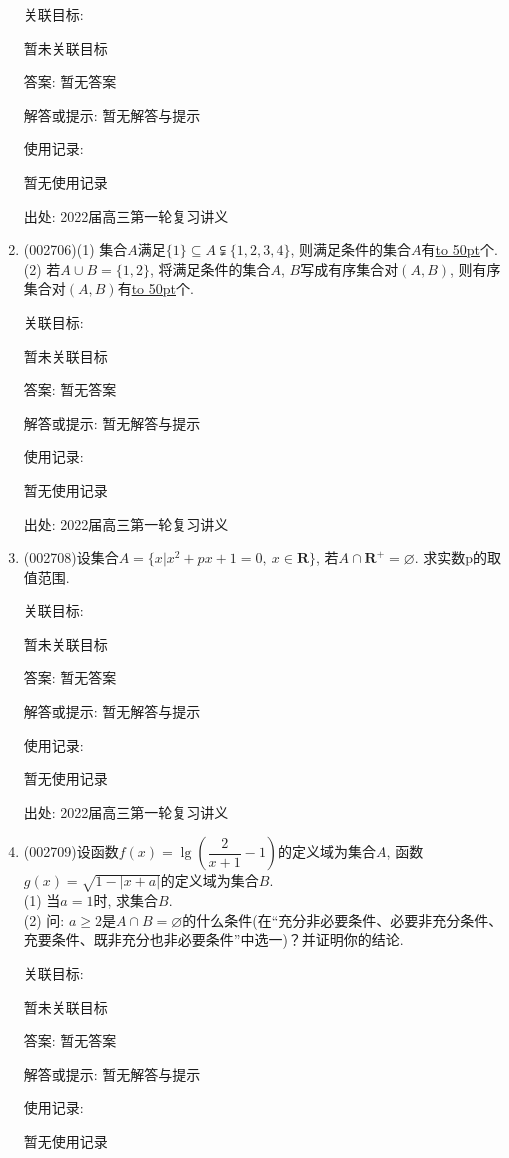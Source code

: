 \documentclass[10pt,a4paper]{article}
\newcommand{\blank}[1]{\underline{\hbox to #1pt{}}}
\begin{document}
\begin{enumerate}[1.]
关联目标:

暂未关联目标

答案: 暂无答案

解答或提示: 暂无解答与提示

使用记录:

暂无使用记录


出处: 2022届高三第一轮复习讲义
\item { (002706)}(1) 集合$A$满足$\{1\}\subseteq A \subsetneqq \{1,2,3,4\}$, 则满足条件的集合$A$有\blank{50}个.
(2) 若$A\cup B=\{1,2\}$, 将满足条件的集合$A$, $B$写成有序集合对$(A,B)$, 则有序集合对$(A,B)$有\blank{50}个.


关联目标:

暂未关联目标

答案: 暂无答案

解答或提示: 暂无解答与提示

使用记录:

暂无使用记录


出处: 2022届高三第一轮复习讲义
\item { (002708)}设集合$A=\{x|x^2+px+1=0,\ x\in \mathbf{R}\}$, 若$A\cap \mathbf{R}^+=\varnothing$. 求实数p的取值范围.


关联目标:

暂未关联目标

答案: 暂无答案

解答或提示: 暂无解答与提示

使用记录:

暂无使用记录


出处: 2022届高三第一轮复习讲义
\item { (002709)}设函数$f(x)=\lg (\dfrac2{x+1}-1)$的定义域为集合$A$, 函数$g(x)=\sqrt{1-|x+a|}$的定义域为集合$B$.\\
(1) 当$a=1$时, 求集合$B$.\\
(2) 问: $a\ge 2$是$A\cap B=\varnothing$的什么条件(在``充分非必要条件、必要非充分条件、充要条件、既非充分也非必要条件''中选一)？并证明你的结论.


关联目标:

暂未关联目标

答案: 暂无答案

解答或提示: 暂无解答与提示

使用记录:

暂无使用记录



\end{enumerate}
\end{document}

